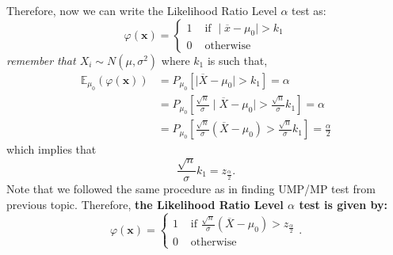 \documentclass[a4paper]{article}
\begin{document}
Therefore, now we can write the Likelihood Ratio Level $\alpha$ test as:
\[
	\varphi\left( \mathbf{x} \right)  = \begin{cases}
		1 & \text{ if }  \mid \overline{x} - \mu_0 \mid >k_1\\
		0 & \text{ otherwise}
	\end{cases}
\]
\textit{remember that $X_{i} \sim N\left( \mu,\sigma^2 \right) $}
\newline
where $k_1$ is such that,
\begin{equation*}
	\begin{split}
		\mathbb{E}_{\mu_0}\left( \varphi\left( \mathbf{x} \right)  \right) &=  P_{\mu_0}\left[  \mid \overline{X} - \mu_0	 \mid  > k_1\right] = \alpha\\
	&= 	P_{\mu_0} \left[ \frac{\sqrt{n} }{\sigma} \mid \overline{X} - \mu_0 \mid  > \frac{\sqrt{n} }{\sigma}k_1\right] = \alpha\\
	&=  P_{\mu_0}\left[ \frac{\sqrt{n}}{\sigma}\left( \overline{X} - \mu_0 \right) > \frac{\sqrt{n} }{\sigma}k_1 \right] = \frac{\alpha}{2} 
\end{split}
\end{equation*}
which implies that
\[
	\frac{\sqrt{n} }{\sigma} k_1 = z_{\frac{\alpha}{2}}
.\] 
Note that we followed the same procedure as in finding UMP/MP test from previous topic.
\newline\newline
Therefore, \textbf{the Likelihood Ratio Level $\alpha$ test is given by:} 
\[
	\varphi\left( \mathbf{x} \right)  = \begin{cases}
		1 & \text{ if } \frac{\sqrt{n} }{\sigma}\left( \overline{X} - \mu_0 \right) > z_{\frac{\alpha}{2}}\\
		0 & \text{ otherwise } 
	\end{cases}
.\] 
\end{document}
